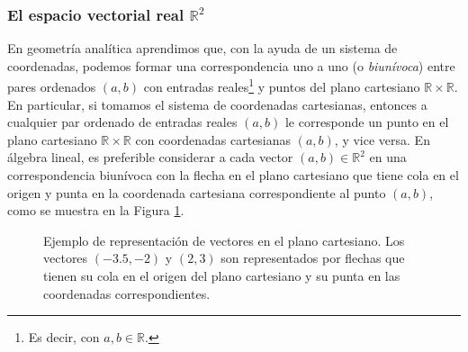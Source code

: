 \documentclass[apuntes]{subfiles}
\begin{document}
\subsubsection*{El espacio vectorial real \texorpdfstring{$\mathbb{R}^2$}{TEXT}} \label{Sssec: El espacio vectorial real R^2}

En geometría analítica aprendimos que, con la ayuda de un sistema de coordenadas, podemos formar una correspondencia uno a uno (o \emph{biunívoca}) entre pares ordenados $(a,b)$ con entradas reales\footnote{Es decir, con $a,b\in\mathbb{R}$.} y puntos del plano cartesiano $\mathbb{R}\times\mathbb{R}$. En particular, si tomamos el sistema de coordenadas cartesianas, entonces a cualquier par ordenado de entradas reales $(a,b)$ le corresponde un punto en el plano cartesiano $\mathbb{R}\times\mathbb{R}$ con coordenadas cartesianas $(a,b)$, y vice versa. En álgebra lineal, es preferible considerar a cada vector $(a,b)\in\mathbb{R}^2$ en una correspondencia biunívoca con la flecha en el plano cartesiano que tiene cola en el origen y punta en la coordenada cartesiana correspondiente al punto $(a,b)$, como se muestra en la Figura \ref{fig:Correspondencias_del_plano_cartesiano}. \\

\begin{figure}[h!]
    \centering
    \caption{Ejemplo de representación de vectores en el plano cartesiano. Los vectores $(-3.5,-2)$ y $(2,3)$ son representados por flechas que tienen su cola en el origen del plano cartesiano y su punta en las coordenadas correspondientes.}
    \label{fig:Correspondencias_del_plano_cartesiano}
\end{figure}
\end{document}
